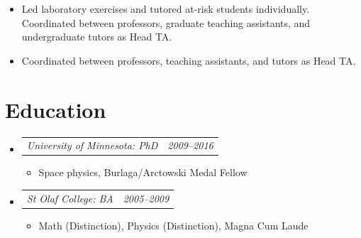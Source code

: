 \documentclass[12pt,letterpaper]{article}
\makeatletter
\newcommand{\headerpair}[2]{
    \begin{tabular*}{\linewidth}{l@{ \extracolsep{\fill} }r} {\large\emph{#1}} & {\large\emph{#2}}
    \end{tabular*}
}
\newcommand{\headerrow}[3]{\headerpair{#2: #1}{#3}}
\newcommand{\ResumeSection}[1]{\section*{{\color{MidnightBlue}\sout{\hfill} {\ocrfamily #1} \sout{\hfill}}}}
\makeatother
\begin{document}
\begin{itemize}[leftmargin=\parindent]
\begin{itemize}[leftmargin=\parindent]
            \item Led laboratory exercises and tutored at-risk students individually. Coordinated between professors, graduate teaching assistants, and undergraduate tutors as Head TA.

            \item Coordinated between professors, teaching assistants, and tutors as Head TA.

        \end{itemize}

\end{itemize}

\ResumeSection{Education}

\begin{itemize}[leftmargin=\parindent]
    \parskip=0.1em
    \itemsep=1.2em

    \item[]
        \headerrow
            {PhD}
            {University of Minnesota}
            {2009--2016}
        \begin{itemize}[leftmargin=\parindent]
            \item Space physics, Burlaga/Arctowski Medal Fellow
        \end{itemize}
    \item[]
        \headerrow
            {BA}
            {St Olaf College}
            {2005--2009}
        \begin{itemize}[leftmargin=\parindent]
            \item Math (Distinction), Physics (Distinction),
                 Magna Cum Laude
        \end{itemize}
\end{itemize}
\end{document}
